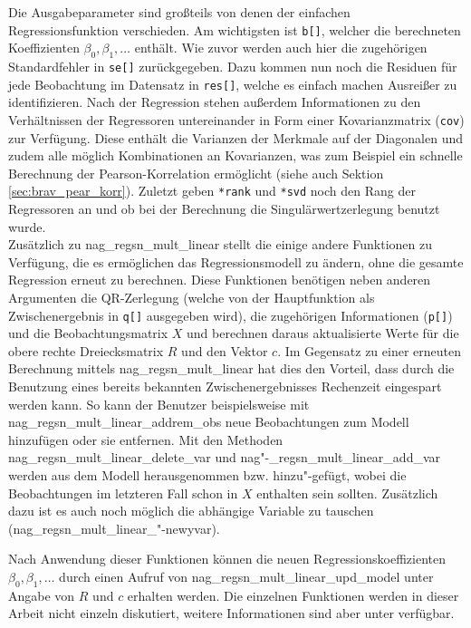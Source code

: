 Die Ausgabeparameter sind großteils von denen der einfachen Regressionsfunktion verschieden.
Am wichtigsten ist \lstinline{b[]}, welcher die berechneten Koeffizienten $\beta_0, \beta_1, \dots$ enthält.
Wie zuvor werden auch hier die zugehörigen Standardfehler in \lstinline{se[]} zurückgegeben.
Dazu kommen nun noch die Residuen für jede Beobachtung im Datensatz in \lstinline{res[]}, welche es einfach machen Ausreißer zu identifizieren.
Nach der Regression stehen außerdem Informationen zu den Verhältnissen der Regressoren untereinander in Form einer Kovarianzmatrix (\lstinline{cov}) zur Verfügung.
Diese enthält die Varianzen der Merkmale auf der Diagonalen und zudem alle möglich Kombinationen an Kovarianzen, was zum Beispiel ein schnelle Berechnung der Pearson-Korrelation ermöglicht (siehe auch Sektion \ref{sec:brav_pear_korr}).
Zuletzt geben \lstinline{*rank} und \lstinline{*svd} noch den Rang der Regressoren an und ob bei der Berechnung die Singulärwertzerlegung benutzt wurde.
\\

Zusätzlich zu nag\_regsn\_mult\_linear stellt die \naglib einige andere Funktionen zu Verfügung, die es ermöglichen das Regressionsmodell zu ändern, ohne die gesamte Regression erneut zu berechnen.
Diese Funktionen benötigen neben anderen Argumenten die QR-Zerlegung (welche von der Hauptfunktion als Zwischenergebnis in \lstinline{q[]} ausgegeben wird), die zugehörigen Informationen (\lstinline{p[]}) und die Beobachtungsmatrix $X$ und berechnen daraus aktualisierte Werte für die obere rechte Dreiecksmatrix $R$ und den Vektor $c$.
Im Gegensatz zu einer erneuten Berechnung mittels nag\_regsn\_mult\_linear hat dies den Vorteil, dass durch die Benutzung eines bereits bekannten Zwischenergebnisses Rechenzeit eingespart werden kann.
So kann der Benutzer beispielsweise mit nag\_regsn\_mult\_linear\_addrem\_obs neue Beobachtungen zum Modell hinzufügen oder sie entfernen.
Mit den Methoden nag\_regsn\_mult\_linear\_delete\_var und nag"-\_regsn\_mult\_linear\_add\_var werden aus dem Modell herausgenommen bzw. hinzu"-gefügt, wobei die Beobachtungen im letzteren Fall schon in $X$ enthalten sein sollten.
Zusätzlich dazu ist es auch noch möglich die abhängige Variable zu tauschen (nag\_regsn\_mult\_linear\_"-newyvar).

Nach Anwendung dieser Funktionen können die neuen Regressionskoeffizienten $\beta_0, \beta_1, \dots$ durch einen Aufruf von nag\_regsn\_mult\_linear\_upd\_model unter Angabe von $R$ und $c$ erhalten werden.
Die einzelnen Funktionen werden in dieser Arbeit nicht einzeln diskutiert, weitere Informationen sind aber unter \citep{nag:contents} verfügbar.







